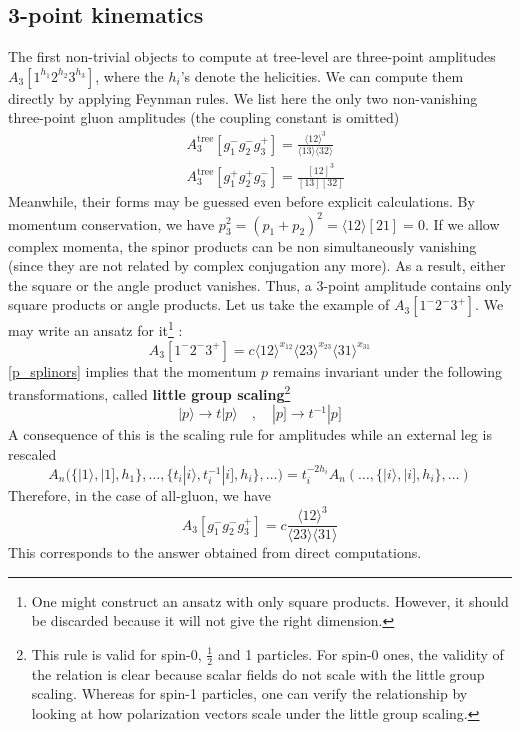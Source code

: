 \subsection*{3-point kinematics}
The first non-trivial objects to compute at tree-level are three-point amplitudes $A_3[1^{h_1}2^{h_2}3^{h_3}]$, where the $h_i$'s denote the helicities.
We can compute them directly by applying Feynman rules. 
We list here the only two non-vanishing three-point gluon amplitudes (the coupling constant is omitted)
\begin{equation}
\begin{split}
& A^{\mathrm{tree}}_3[g_1^- g_2^- g_3^+] = \frac{\langle 12 \rangle^3}{\langle 13 \rangle \langle 32 \rangle}
\\
& A^{\mathrm{tree}}_3[g_1^+ g_2^+ g_3^-] = \frac{ [12]^3}{[13 ][ 32 ]}
\end{split}
\end{equation}
Meanwhile, their forms may be guessed even before explicit calculations.  
By momentum conservation, we have $p_3^2 = (p_1 + p_2)^2 = \langle 12\rangle[21] = 0$. 
If we allow complex momenta, the spinor products can be non simultaneously vanishing (since they are not related by complex conjugation any more). 
As a result, either the square or the angle product vanishes.
Thus, a 3-point amplitude contains only square products or angle products. 
Let us take the example of $A_3[1^{-}2^{-}3^{+}]$.
We may write an ansatz for it\footnote{One might construct an ansatz with only square products. However, it should be discarded because it will not give the right dimension.} :
\begin{equation}
A_3[1^{-}2^{-}3^{+}] = c\langle 12 \rangle^{x_{12}}\langle 23 \rangle^{x_{23}}\langle 31 \rangle^{x_{31}}
\end{equation}
\cref{p_splinors} implies that the momentum $p$ remains invariant under the following transformations, called \textbf{little group scaling}\footnote{This rule is valid for spin-0, $\frac{1}{2}$ and 1 particles. 
For spin-0 ones, the validity of the relation is clear because scalar fields do not scale with the little group scaling.
Whereas for spin-1 particles, one can verify the relationship by looking at how polarization vectors scale under the little group scaling.
}
\begin{equation}
|p\rangle \rightarrow t| p\rangle \quad,\quad 
|p]\rightarrow t^{-1} |p]
\end{equation} 
A consequence of this is the scaling rule for amplitudes while an external leg is rescaled
\begin{equation}
A_n \big(\{ |1\rangle, |1], h_1\},\ldots,\{t_i|i\rangle, t_i^{-1}|i], h_i\},\ldots\big) = 
t_i^{-2h_i}A_n(\ldots, \{|i\rangle,|i], h_i\},\ldots)
\end{equation}
Therefore, in the case of all-gluon, we have
\begin{equation}
A_3[g_1^-g_2^-g_3^+] = c\frac{\langle 12\rangle^3}{\langle 23 \rangle\langle 31\rangle}
\end{equation}
This corresponds to the answer obtained from direct computations.
%
%
